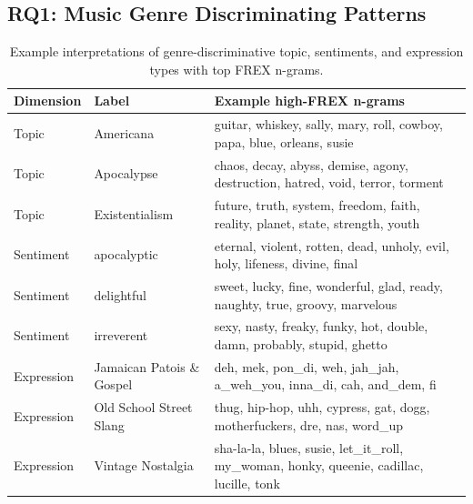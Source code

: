\documentclass{article}
\begin{document}
\subsection{RQ1: Music Genre Discriminating Patterns}
\begin{table}[tb]
  \setlength{\tabcolsep}{6pt}
  \centering
  \footnotesize
  \begin{tabular}{l l l}
    \toprule
    Dimension  & Label & Example high-FREX n-grams \\
    \midrule
    Topic & Americana & guitar, whiskey, sally, mary, roll, cowboy, papa, blue, orleans, susie  \\
    Topic & Apocalypse &  chaos, decay, abyss, demise, agony, destruction, hatred, void, terror, torment \\
    Topic & Existentialism & future, truth, system, freedom, faith, reality, planet, state, strength, youth \\
    \midrule
    Sentiment & apocalyptic & eternal, violent, rotten, dead, unholy, evil, holy, lifeness, divine, final  \\
    Sentiment & delightful & sweet, lucky, fine, wonderful, glad, ready, naughty, true, groovy, marvelous \\
    Sentiment & irreverent & sexy, nasty, freaky, funky, hot, double, damn, probably, stupid, ghetto \\
    \midrule
    Expression & Jamaican Patois \& Gospel & deh, mek, pon\_di, weh, jah\_jah, a\_weh\_you, inna\_di, cah, and\_dem, fi \\
    Expression & Old School Street Slang & thug, hip-hop, uhh, cypress, gat, dogg, motherfuckers, dre, nas, word\_up \\ 
    Expression & Vintage Nostalgia & sha-la-la, blues, susie, let\_it\_roll, my\_woman, honky, queenie, cadillac, lucille, tonk \\
    \bottomrule
  \end{tabular}
  \caption{Example interpretations of genre-discriminative topic, sentiments, and expression types with top FREX n-grams.}
  \label{tab:frex_examples}
\end{table}
\end{document}

